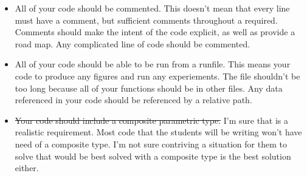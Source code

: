 \documentclass[12pt]{article}
\begin{document}
\begin{enumerate}
\begin{itemize}
			\item All of your code should be commented. This doesn't mean that every line must have a comment, but sufficient comments throughout a required. Comments should make the intent of the code explicit, as well as provide a road map. Any complicated line of code should be commented. 
			\item All of your code should be able to be run from a runfile. This means your code to produce any figures and run any experiements. The file shouldn't be too long because all of your functions should be in other files. Any data referenced in your code should be referenced by a relative path. 
			\item \st{Your code should include a composite parametric type. } I'm sure that is a realistic requirement. Most code that the students will be writing won't have need of a composite type. I'm not sure contriving a situation for them to solve that would be best solved with a composite type is the best solution either. 
		\end{itemize}
	\end{enumerate}
	
	\bigskip
	

	
	
\end{document}
